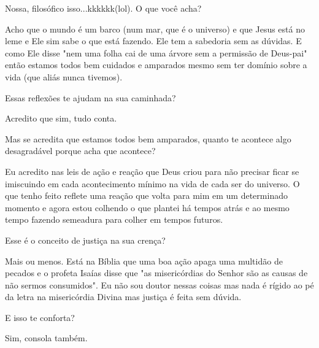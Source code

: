 \emdash{}Nossa, filosófico isso...kkkkkk(lol). O que você acha?

\emdash{}Acho que o mundo é um barco (num mar, que é o universo) e que Jesus está no leme e Ele sim sabe o que está fazendo. Ele tem a sabedoria sem as dúvidas. E como Ele disse "nem uma folha cai de uma árvore sem a permissão de Deus-pai" então estamos todos bem cuidados e amparados mesmo sem ter domínio sobre a vida (que aliás nunca tivemos).

\emdash{}Essas reflexões te ajudam na sua caminhada?

\emdash{}Acredito que sim, tudo conta.

\emdash{}Mas se acredita que estamos todos bem amparados, quanto te acontece algo desagradável porque acha que acontece?

\emdash{}Eu acredito nas leis de ação e reação que Deus criou para não precisar ficar se imiscuindo em cada acontecimento mínimo na vida de cada ser do universo. O que tenho feito reflete  uma reação que volta para mim em um determinado momento e agora estou colhendo o que plantei há tempos atrás e ao mesmo tempo fazendo semeadura para colher em tempos futuros.

\emdash{}Esse é o conceito de justiça na sua crença?

\emdash{}Mais ou menos. Está na Bíblia que uma boa ação apaga uma multidão de pecados e o profeta Isaías disse que "as misericórdias do Senhor são as causas de não sermos consumidos". Eu não sou doutor nessas coisas mas nada é rígido ao pé da letra na misericórdia Divina mas justiça é feita sem dúvida.

\emdash{}E isso te conforta?

\emdash{}Sim, consola também.
